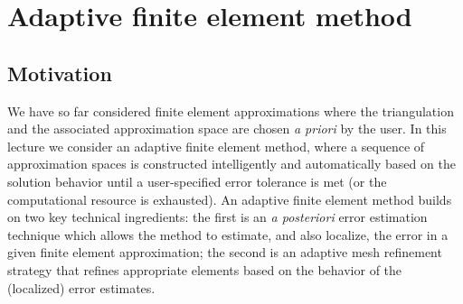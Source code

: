 \chapter{Adaptive finite element method}

\disclaimer

\section{Motivation}
We have so far considered finite element approximations where the triangulation and the associated approximation space are chosen \emph{a priori} by the user.  In this lecture we consider an adaptive finite element method, where a sequence of approximation spaces is constructed intelligently and automatically based on the solution behavior until a user-specified error tolerance is met (or the computational resource is exhausted).  An adaptive finite element method builds on two key technical ingredients: the first is an \emph{a posteriori} error estimation technique which allows the method to estimate, and also localize, the error in a given finite element approximation; the second is an adaptive mesh refinement strategy that refines appropriate elements based on the behavior of the (localized) error estimates. %

